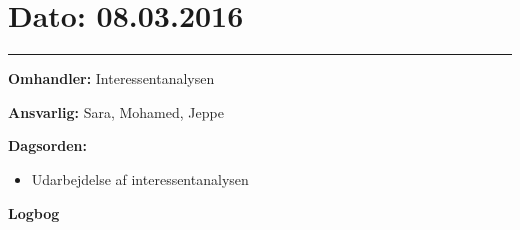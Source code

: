 \section{Dato: 08.03.2016}
\hrule

\textbf{Omhandler:} Interessentanalysen

\textbf{Ansvarlig:} Sara, Mohamed, Jeppe

\textbf{Dagsorden:}
\begin{itemize}
	\item Udarbejdelse af interessentanalysen
\end{itemize}

\textbf{Logbog}
\\
